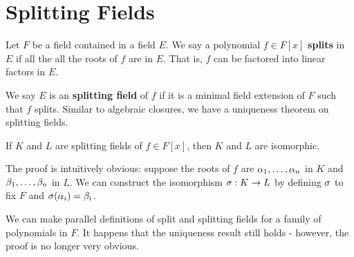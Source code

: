 \section{Splitting Fields}
Let $F$ be a field contained in a field $E$. We say a polynomial $f \in F[x]$ \textbf{splits} in $E$ if all the all the roots of $f$ are in $E$. That is, $f$ can be factored into linear factors in $E$.

We say $E$ is an \textbf{splitting field} of $f$ if it is a minimal field extension of $F$ such that $f$ splits. Similar to algebraic closures, we have a uniqueness theorem on splitting fields.
\begin{center}
    If $K$ and $L$ are splitting fields of $f \in F[x]$, then $K$ and $L$ are isomorphic.
\end{center}
The proof is intuitively obvious: suppose the roots of $f$ are $\alpha_1, \dots, \alpha_n$ in $K$ and $\beta_1, \dots, \beta_n$ in $L$. We can construct the isomorphism $\sigma: K \rightarrow L$ by defining $\sigma$ to fix $F$ and $\sigma(\alpha_i) = \beta_i$.

We can make parallel definitions of split and splitting fields for a family of polynomials in $F$. It happens that the uniqueness result still holds - however, the proof is no longer very obvious.
